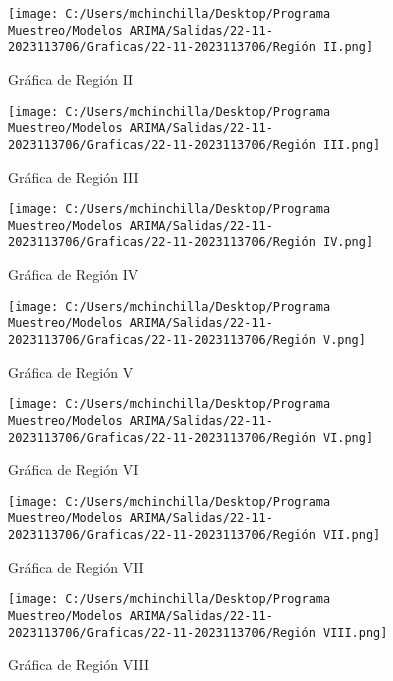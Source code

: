 \documentclass{article}%
\begin{document}
%


\begin{figure}[H]%
\centering%
\texttt{[image: C:/Users/mchinchilla/Desktop/Programa Muestreo/Modelos ARIMA/Salidas/22-11-2023113706/Graficas/22-11-2023113706/Región II.png]}%
\caption{Gráfica de Región II}%
\end{figure}

%


\begin{figure}[H]%
\centering%
\texttt{[image: C:/Users/mchinchilla/Desktop/Programa Muestreo/Modelos ARIMA/Salidas/22-11-2023113706/Graficas/22-11-2023113706/Región III.png]}%
\caption{Gráfica de Región III}%
\end{figure}

%


\begin{figure}[H]%
\centering%
\texttt{[image: C:/Users/mchinchilla/Desktop/Programa Muestreo/Modelos ARIMA/Salidas/22-11-2023113706/Graficas/22-11-2023113706/Región IV.png]}%
\caption{Gráfica de Región IV}%
\end{figure}

%


\begin{figure}[H]%
\centering%
\texttt{[image: C:/Users/mchinchilla/Desktop/Programa Muestreo/Modelos ARIMA/Salidas/22-11-2023113706/Graficas/22-11-2023113706/Región V.png]}%
\caption{Gráfica de Región V}%
\end{figure}

%


\begin{figure}[H]%
\centering%
\texttt{[image: C:/Users/mchinchilla/Desktop/Programa Muestreo/Modelos ARIMA/Salidas/22-11-2023113706/Graficas/22-11-2023113706/Región VI.png]}%
\caption{Gráfica de Región VI}%
\end{figure}

%


\begin{figure}[H]%
\centering%
\texttt{[image: C:/Users/mchinchilla/Desktop/Programa Muestreo/Modelos ARIMA/Salidas/22-11-2023113706/Graficas/22-11-2023113706/Región VII.png]}%
\caption{Gráfica de Región VII}%
\end{figure}

%


\begin{figure}[H]%
\centering%
\texttt{[image: C:/Users/mchinchilla/Desktop/Programa Muestreo/Modelos ARIMA/Salidas/22-11-2023113706/Graficas/22-11-2023113706/Región VIII.png]}%
\caption{Gráfica de Región VIII}%
\end{figure}
\end{document}
